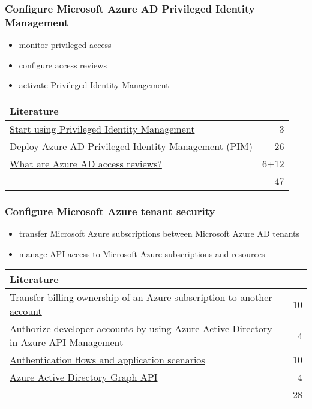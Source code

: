 \subsubsection{Configure Microsoft Azure AD Privileged Identity Management}
\begin{itemize}
\item monitor privileged access 
\item configure access reviews 
\item activate Privileged Identity Management 
\end{itemize}

\begin{tabular}{p{14cm} | r}
\textbf{Literature} & \\
\hline
\href{https://docs.microsoft.com/en-us/azure/active-directory/privileged-identity-management/pim-getting-started}{Start using Privileged Identity Management} & 3 \\
\href{https://docs.microsoft.com/en-us/azure/active-directory/privileged-identity-management/pim-deployment-plan}{Deploy Azure AD Privileged Identity Management (PIM)} & 26 \\
\href{https://docs.microsoft.com/en-us/azure/active-directory/governance/access-reviews-overview}{What are Azure AD access reviews?} & 6+12 \\
\cline{2-2} 
 & 47 \\
\end{tabular}

\subsubsection{Configure Microsoft Azure tenant security}
\begin{itemize}
\item transfer Microsoft Azure subscriptions between Microsoft Azure AD tenants 
\item manage API access to Microsoft Azure subscriptions and resources 
\end{itemize}

\begin{tabular}{p{14cm} | r}
\textbf{Literature} & \\
\hline
\href{https://docs.microsoft.com/en-us/azure/billing/billing-subscription-transfer}{Transfer billing ownership of an Azure subscription to another account} & 10 \\
\href{https://docs.microsoft.com/en-us/azure/api-management/api-management-howto-aad}{Authorize developer accounts by using Azure Active Directory in Azure API Management} & 4 \\
\href{https://docs.microsoft.com/en-us/azure/active-directory/develop/authentication-flows-app-scenarios}{Authentication flows and application scenarios} & 10 \\
\href{https://docs.microsoft.com/en-us/azure/active-directory/develop/active-directory-graph-api}{Azure Active Directory Graph API} & 4 \\
\cline{2-2} 
 & 28 \\
\end{tabular}

